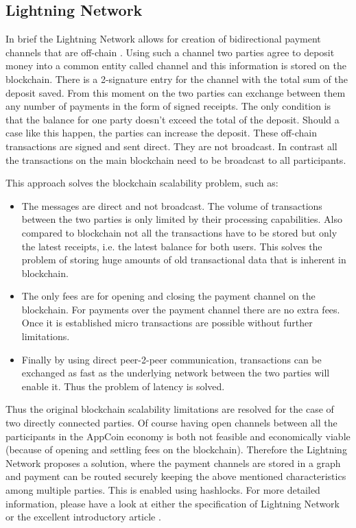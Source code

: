 \subsection{Lightning Network}
In brief the Lightning Network allows for creation of bidirectional payment channels that are off-chain \cite{LighthingNetwork}. Using such a channel two parties agree to deposit money into a common entity called channel and this information is stored on the blockchain. There is a 2-signature entry for the channel with the total sum of the deposit saved. From this moment on the two parties can exchange between them any number of payments in the form of signed receipts. The only condition is that the balance for one party doesn't exceed the total of the deposit. Should a case like this happen, the parties can increase the deposit. These off-chain transactions are signed and sent direct. They are not broadcast. In contrast all the transactions on the main blockchain need to be broadcast to all participants. 

This approach solves the blockchain scalability problem, such as:

\begin{itemize}
    \item The messages are direct and not broadcast. The volume of transactions between the two parties is only limited by their processing capabilities. Also compared to blockchain not all the transactions have to be stored but only the latest receipts, i.e. the latest balance for both users. This solves the problem of storing huge amounts of old transactional data that is inherent in blockchain.
    \item The only fees are for opening and closing the payment channel on the blockchain. For payments over the payment channel there are no extra fees. Once it is established micro transactions are possible without further limitations.
    \item Finally by using direct peer-2-peer communication, transactions can be exchanged as fast as the underlying network between the two parties will enable it. Thus the problem of latency is solved.
\end{itemize}

Thus the original blockchain scalability limitations are resolved for the case of two directly connected parties. Of course having open channels between all the participants in the AppCoin economy is both not feasible and economically viable (because of opening and settling fees on the blockchain). Therefore the Lightning Network proposes a solution, where the payment channels are stored in a graph and payment can be routed securely keeping the above mentioned characteristics among multiple parties. This is enabled using hashlocks. For more detailed information, please have a look at either the specification of Lightning Network or the excellent introductory article \cite{starkness}.



